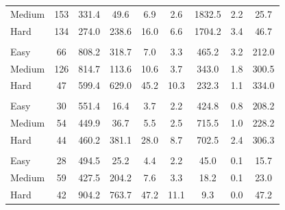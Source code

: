 \documentclass[11pt, a4paper, logo, copyright, nonumbering]{seed}
\newcommand{\multiswebench}{Multi-SWE-bench\xspace}
\begin{document}
\begin{table}[!ht]
{\begin{tabular}{l|c|c|ccc|ccc}
Medium & 153 & 331.4 & 49.6 & 6.9 & 2.6 & 1832.5 & 2.2 & 25.7 \\ 
Hard & 134 & 274.0 & 238.6 & 16.0 & 6.6 & 1704.2 & 3.4 & 46.7 \\ 
    \hline
    \rowcolor{mygray} \multicolumn{9}{c}{Rust} \\
Easy & 66 & 808.2 & 318.7 & 7.0 & 3.3 & 465.2 & 3.2 & 212.0 \\ 
Medium & 126 & 814.7 & 113.6 & 10.6 & 3.7 & 343.0 & 1.8 & 300.5 \\ 
Hard & 47 & 599.4 & 629.0 & 45.2 & 10.3 & 232.3 & 1.1 & 334.0 \\ 
    \hline
    \rowcolor{mygray} \multicolumn{9}{c}{C} \\
Easy & 30 & 551.4 & 16.4 & 3.7 & 2.2 & 424.8 & 0.8 & 208.2 \\ 
Medium & 54 & 449.9 & 36.7 & 5.5 & 2.5 & 715.5 & 1.0 & 228.2 \\ 
Hard & 44 & 460.2 & 381.1 & 28.0 & 8.7 & 702.5 & 2.4 & 306.3 \\ 
    \hline
    \rowcolor{mygray} \multicolumn{9}{c}{C++} \\
Easy & 28 & 494.5 & 25.2 & 4.4 & 2.2 & 45.0 & 0.1 & 15.7 \\ 
Medium & 59 & 427.5 & 204.2 & 7.6 & 3.3 & 18.2 & 0.1 & 23.0 \\ 
Hard & 42 & 904.2 & 763.7 & 47.2 & 11.1 & 9.3 & 0.0 & 47.2 \\  
    \bottomrule
    \end{tabular}}
    \label{tab:difficult_stat}
\end{table}



\begin{table}[!ht]
    \centering
    \caption{Scoring statistics for \multiswebench from the verification questionnaire.}
    \label{tab:dataset}
\end{table}
\end{document}
